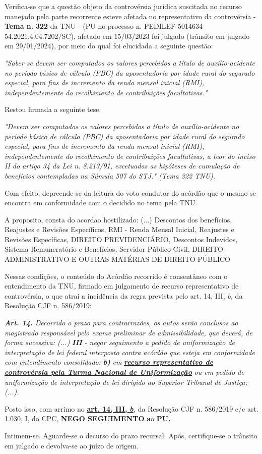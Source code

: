 \documentclass[12pt]{article}
\begin{document}
\justifying
\noindent Verifica-se que a questão objeto da controvérsia jurídica suscitada no recurso manejado pela parte recorrente esteve afetada no representativo da controvérsia - \textbf{Tema n. }\textbf{322} da TNU - (PU no processo n. PEDILEF 5014634-54.2021.4.04.7202/SC),  afetado em 15/03/2023 foi julgado (trânsito em julgado em 29/01/2024), por meio do qual foi elucidada a seguinte questão:

\noindent \textit{"Saber se devem ser computados os valores percebidos a título de auxílio-acidente no período básico de cálculo (PBC) da aposentadoria por idade rural do segurado especial, para fins de incremento da renda mensal inicial (RMI), independentemente do recolhimento de contribuições facultativas."}

\noindent Restou firmada a seguinte tese:

\noindent \textit{"Devem ser computados os valores percebidos a título de auxílio-acidente no período básico de cálculo (PBC) da aposentadoria por idade rural do segurado especial, para fins de incremento da renda mensal inicial (RMI), independentemente do recolhimento de contribuições facultativas, a teor do inciso II do artigo 34 da Lei n. 8.213/91, excetuadas as hipóteses de cumulação de benefícios contempladas na Súmula 507 do STJ." (Tema 322 TNU).}

\noindent Com efeito, depreende-se da leitura do voto condutor do acórdão que o mesmo se encontra em conformidade com o decidido no  tema pela TNU.

\noindent A proposito, consta do acordao hostilizado: (...) Descontos dos benefícios, Reajustes e Revisões Específicos, RMI - Renda Mensal Inicial, Reajustes e Revisões Específicas, DIREITO PREVIDENCIÁRIO, Descontos Indevidos, Sistema Remuneratório e Benefícios, Servidor Público Civil, DIREITO ADMINISTRATIVO E OUTRAS MATÉRIAS DE DIREITO PÚBLICO

\noindent Nessas condições, o conteúdo do Acórdão recorrido é consentâneo com o entendimento da TNU, firmado em julgamento de recurso representativo de controvérsia, o que atrai a incidência da regra prevista pelo art. 14, III, \textit{b,} da Resolução CJF n. 586/2019:

\noindent \textit{\textbf{Art. 14.}}\textit{ Decorrido o prazo para contrarrazões, os autos serão conclusos ao magistrado responsável pelo exame preliminar de admissibilidade, que deverá, de forma sucessiva: (...) }\textit{\textbf{III }}\textit{- negar seguimento a pedido de uniformização de interpretação de lei federal interposto contra acórdão que esteja em conformidade com entendimento consolidado: }\textit{\textbf{b)}}\textit{ em }\uline{\textit{\textbf{recurso representativo de controvérsia pela Turma Nacional de Uniformização}}}\textit{ ou em pedido de uniformização de interpretação de lei dirigido ao Superior Tribunal de Justiça;(...).}

\noindent Posto isso, com arrimo no \uline{\textbf{art. 14, III, }}\uline{\textit{\textbf{b}}}\textit{,} da Resolução CJF n. 586/2019 c/c art. 1.030, I, do CPC, \textbf{NEGO SEGUIMENTO }\textbf{a}o\textbf{ PU}\textbf{.}

\noindent Intimem-se. Aguarde-se o decurso do prazo recursal. Após, certifique-se o trânsito em julgado e devolva-se ao juízo de origem.
\end{document}
